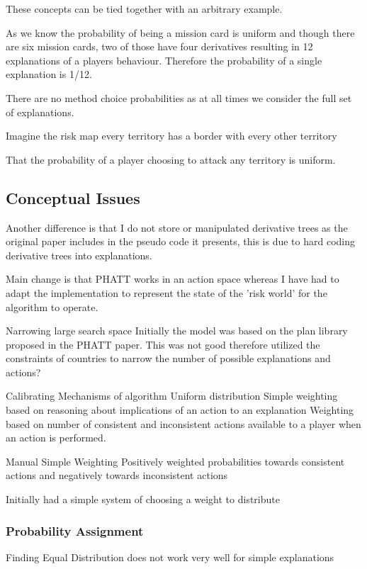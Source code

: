 \documentclass[parskip]{cs4rep}
\begin{document}
These concepts can be tied together with an arbitrary example.

As we know the probability of being a mission card is uniform and though there are six mission cards, two of those have four derivatives resulting in 12 explanations of a players behaviour. Therefore the probability of a single explanation is 1/12.

There are no method choice probabilities as at all times we consider the full set of explanations.

Imagine the risk map every territory has a border with every other territory

That the probability of a player choosing to attack any territory is uniform.

\subsection{Conceptual Issues}

Another difference is that I do not store or manipulated derivative trees as the original paper includes in the pseudo code it presents, this is due to hard coding derivative trees into explanations.

Main change is that PHATT works in an action space whereas I have had to adapt the implementation to represent the state of the 'risk world' for the algorithm to operate.

Narrowing large search space
Initially the model was based on the plan library proposed in the PHATT paper. This was not good therefore utilized the constraints of countries to narrow the number of possible explanations and actions?

Calibrating Mechanisms of algorithm
Uniform distribution
Simple weighting based on reasoning about implications of an action to an explanation
Weighting based on number of consistent and inconsistent actions available to a player when an action is performed.

Manual Simple Weighting
Positively weighted probabilities towards consistent actions and negatively towards inconsistent actions

Initially had a simple system of choosing a weight to distribute

\subsubsection{Probability Assignment}

Finding
Equal Distribution does not work very well for simple explanations
\end{document}
